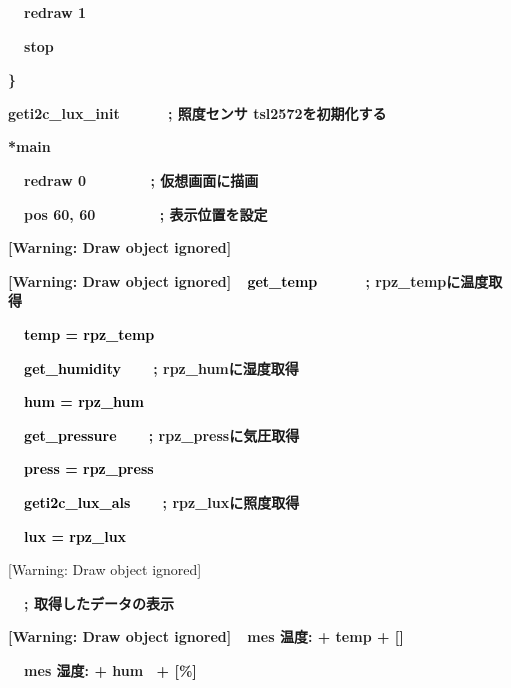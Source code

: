 \documentclass[a4paper,dvipdfmx]{jarticle}
\begin{document}
{\ttfamily\bfseries
\ \ redraw 1}

{\ttfamily\bfseries
\ \ stop}

{\ttfamily\bfseries
\}}


\bigskip

{\ttfamily\bfseries
geti2c\_lux\_init\ \ \ \ \ \ \textcolor[rgb]{0.0,0.0,0.8}{; 照度センサ
tsl2572を初期化する}}


\bigskip

{\ttfamily\bfseries
*main}

{\ttfamily\bfseries
\ \ redraw 0\ \ \ \ \ \ \ \ \textcolor[rgb]{0.0,0.0,0.8}{; 仮想画面に描画}}

{\ttfamily\bfseries
\ \ pos 60, 60\ \ \ \ \ \ \ \ \textcolor[rgb]{0.0,0.0,0.8}{; 表示位置を設定}}

{\ttfamily\bfseries
[Warning: Draw object ignored]\ \ }

{\ttfamily\bfseries
[Warning: Draw object
ignored]\textcolor[rgb]{0.0,0.0,0.8}{\ \ }\textcolor{black}{get\_temp\ \ \ \ \ \ }\textcolor[rgb]{0.0,0.0,0.8}{;
rpz\_tempに温度取得}}

{\ttfamily\bfseries
\textcolor[rgb]{0.0,0.0,0.8}{\ \ }\textcolor{black}{temp = rpz\_temp}}

{\ttfamily\bfseries
\textcolor{black}{\ \ get\_humidity}\textcolor[rgb]{0.0,0.0,0.8}{\ \ \ \ ; rpz\_humに湿度取得}}

{\ttfamily\bfseries
\textcolor[rgb]{0.0,0.0,0.8}{\ \ }\textcolor{black}{hum = rpz\_hum}}

{\ttfamily\bfseries
\textcolor{black}{\ \ get\_pressure}\textcolor[rgb]{0.0,0.0,0.8}{\ \ \ \ ;
rpz\_pressに気圧取得}}

{\ttfamily\bfseries
\textcolor[rgb]{0.0,0.0,0.8}{\ \ }\textcolor{black}{press = rpz\_press}}

{\ttfamily\bfseries
\textcolor[rgb]{0.0,0.0,0.8}{\ \ }\textcolor{black}{geti2c\_lux\_als\ \ \ \ }\textcolor[rgb]{0.0,0.0,0.8}{;
rpz\_luxに照度取得}}

{\ttfamily\bfseries
\textcolor[rgb]{0.0,0.0,0.8}{\ \ }\textcolor{black}{lux = rpz\_lux}}

[Warning: Draw object ignored]

{\ttfamily\bfseries
\ \ ; 取得したデータの表示}

{\ttfamily\bfseries
[Warning: Draw object ignored]\ \ mes {\textquotedbl}温度: {\textquotedbl} + temp + {\textquotedbl}
[{\textcelsius}]{\textquotedbl}}

{\ttfamily\bfseries
\ \ mes {\textquotedbl}湿度: {\textquotedbl} + hum \ + {\textquotedbl} [\%]{\textquotedbl}}
\end{document}
